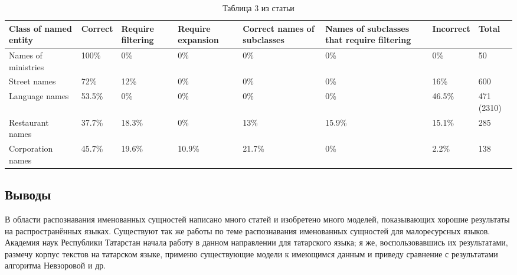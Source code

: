 \begin{table}[h!]
 \begin{tabular}[h]{m{2.2cm}m{1.7cm}m{1.7cm}m{1.8cm}m{1.9cm}m{1.9cm}m{1.7cm}m{1.7cm}}

\hline
\hline
Class of named entity  & Correct & Require filtering & Require expansion & Correct names of subclasses & Names of subclasses that require filtering & Incorrect & Total \\
\hline
 Names of ministries & 100\% & 0\% & 0\% & 0\% & 0\% & 0\% & 50 \\
 \hline
 Street names & 72\% & 12\% & 0\% & 0\% & 0\% & 16\% & 600 \\
 \hline
 Language names & 53.5\% & 0\% & 0\% & 0\% & 0\% & 46.5\% & 471 (2310) \\
 \hline
 Restaurant names & 37.7\% & 18.3\% & 0\% & 13\% & 15.9\% & 15.1\% & 285 \\
 \hline
 Corporation names & 45.7\% & 19.6\% & 10.9\% & 21.7\% & 0\% & 2.2\% & 138 \\
\hline
\hline
\end{tabular}
\caption{Таблица 3 из статьи \cite{Nevzorova}}
\label{table:Nevzorova}
\end{table}

\subsection{Выводы}

В области распознавания именованных сущностей написано много статей и изобретено много моделей, показывающих хорошие результаты на распространённых языках. Существуют так же работы по теме распознавания именованных сущностей для малоресурсных языков. Академия наук Республики Татарстан начала работу в данном направлении для татарского языка; я же, воспользовавшись их результатами, размечу корпус текстов на татарском языке, применю существующие модели к имеющимся данным и приведу сравнение с результатами алгоритма Невзоровой и др.



























